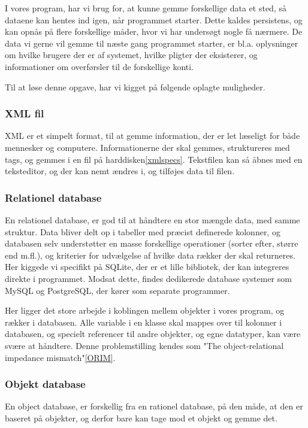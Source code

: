 I vores program, har vi brug for, at kunne gemme forskellige data et sted, så dataene kan hentes ind igen, når programmet starter. Dette kaldes persistens, og kan opnås på flere forskellige måder, hvor vi har undersøgt nogle få nærmere.
De data vi gerne vil gemme til næste gang programmet starter, er bl.a. oplysninger om hvilke brugere der er af systemet, hvilke pligter der eksisterer, og informationer om overførsler til de forskellige konti.

Til at løse denne opgave, har vi kigget på følgende oplagte muligheder.

\subsubsection{XML fil}
XML er et simpelt format, til at gemme information, der er let læseligt for både mennesker og computere. Informationerne der skal gemmes, struktureres med tags, og gemmes i en fil på harddisken\ref{xmlspecs}. Tekstfilen kan så åbnes med en teksteditor, og der kan nemt ændres i, og tilføjes data til filen.


\subsubsection{Relationel database}
En relationel database, er god til at håndtere en stor mængde data, med samme struktur. Data bliver delt op i tabeller med præcist definerede kolonner, og databasen selv understøtter en masse forskellige operationer (sorter efter, større end m.fl.), og kriterier for udvælgelse af hvilke data rækker der skal returneres. Her kiggede vi specifikt på SQLite, der er et lille bibliotek, der kan integreres direkte i programmet. Modsat dette, findes dedikerede database systemer som MySQL og PostgreSQL, der kører som separate programmer.

Her ligger det store arbejde i koblingen mellem objekter i vores program, og rækker i databasen. Alle variable i en klasse skal mappes over til kolonner i databasen, og specielt referencer til andre objekter, og egne datatyper, kan være svære at håndtere. Denne problemstilling kendes som "The object-relational impedance mismatch"\ref{ORIM}.

\subsubsection{Objekt database}
En object database,  er forskellig fra en rationel database, på den måde, at den er baseret på objekter, og derfor bare kan tage mod et objekt og gemme det.


